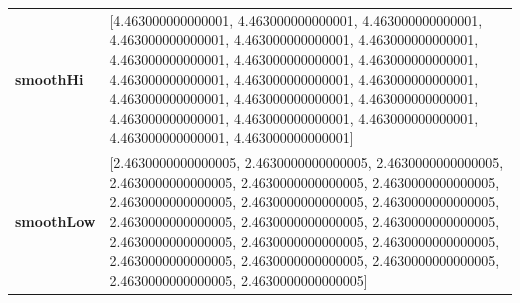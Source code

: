 		\begin{table}[H]
			\centering
			\begin{tabularx}{\textwidth}{lX} 
		\textbf{smoothHi}& [4.463000000000001, 4.463000000000001, 4.463000000000001, 4.463000000000001, 4.463000000000001, 4.463000000000001, 4.463000000000001, 4.463000000000001, 4.463000000000001, 4.463000000000001, 4.463000000000001, 4.463000000000001, 4.463000000000001, 4.463000000000001, 4.463000000000001, 4.463000000000001, 4.463000000000001, 4.463000000000001, 4.463000000000001, 4.463000000000001] \\
		\textbf{smoothLow} &[2.4630000000000005, 2.4630000000000005, 2.4630000000000005, 2.4630000000000005, 2.4630000000000005, 2.4630000000000005, 2.4630000000000005, 2.4630000000000005, 2.4630000000000005, 2.4630000000000005, 2.4630000000000005, 2.4630000000000005, 2.4630000000000005, 2.4630000000000005, 2.4630000000000005, 2.4630000000000005, 2.4630000000000005, 2.4630000000000005, 2.4630000000000005, 2.4630000000000005]\\
		
	\end{tabularx} 
\end{table}
